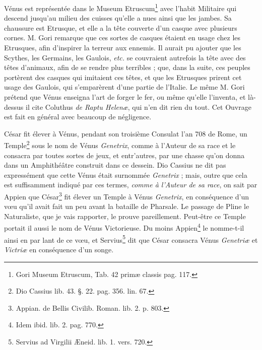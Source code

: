 \documentclass[a4paper, 18pt, oneside]{article}
\begin{document}
Vénus est représentée dans le Museum Etruscum\footnote{Gori Museum Etruscum, Tab. 42 primæ classis pag. 117.} avec l'habit Militaire qui descend jusqu'au milieu des cuisses qu'elle a nues ainsi que les jambes. Sa chaussure est Etrusque, et elle a la tête couverte d'un casque avec plusieurs cornes. M. Gori remarque que ces sortes de casques étaient en usage chez les Etrusques, afin d'inspirer la terreur aux ennemis. Il aurait pu ajouter que les Scythes, les Germains, les Gaulois, \emph{etc.} se couvraient autrefois la tête avec des têtes d'animaux, afin de se rendre plus terribles ; que, dans la suite, ces peuples portèrent des casques qui imitaient ces têtes, et que les Etrusques prirent cet usage des Gaulois, qui s'emparèrent d'une partie de l'Italie. Le même M. Gori prétend que Vénus enseigna l'art de forger le fer, ou même qu'elle l'inventa, et là-dessus il cite Coluthus \emph{de Raptu Helenæ}, qui n'en dit rien du tout. Cet Ouvrage est fait en général avec beaucoup de négligence.

César fit élever à Vénus, pendant son troisième Consulat l'an 708 de Rome, un Temple\footnote{Dio Cassius lib. 43. §. 22. pag. 356. lin. 67.} sous le nom de Vénus \emph{Genetrix}, comme à l'Auteur de sa race et le consacra par toutes sortes de jeux, et entr'autres, par une chasse qu'on donna dans un Amphithéâtre construit dans ce dessein. Dio Cassius ne dit pas expressément que cette Vénus était surnommée \emph{Genetrix} ; mais, outre que cela est suffisamment indiqué par ces termes, \emph{comme à l'Auteur de sa race}, on sait par Appien que César\footnote{Appian. de Bellis Civilib. Roman. lib. 2. p. 803.} fit élever un Temple à Vénus \emph{Genetrix}, en conséquence d'un vœu qu'il avait fait un peu avant la bataille de Pharsale. Le passage de Pline le Naturaliste, que je vais rapporter, le prouve pareillement. Peut-être ce Temple portait il aussi le nom de Vénus Victorieuse. Du moins Appien\footnote{Idem ibid. lib. 2. pag. 770.} le nomme-t-il ainsi en par lant de ce vœu, et Servius\footnote{Servius ad Virgilii Æneid. lib. 1. vers. 720.} dit que César consacra Vénus \emph{Genetriæ} et \emph{Victriæ} en conséquence d'un songe.
\end{document}
